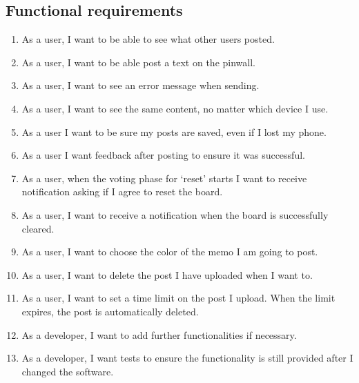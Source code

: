 \documentclass[conference]{IEEEtran}
\numberwithin{figure}{subsection}
\begin{document}
\subsection{Functional requirements}
\begin{enumerate}
 \item As a user, I want to be able to see what other users posted.\\
 \item As a user, I want to be able post a text on the pinwall.\\
 \item As a user, I want to see an error message when sending.\\
 \item As a user, I want to see the same content, no matter which device I use.\\
 \item As a user I want to be sure my posts are saved, even if I lost my phone.\\
 \item As a user I want feedback after posting to ensure it was successful.\\
 \item As a user, when the voting phase for ‘reset’ starts I want to receive notification asking if I agree to reset the board. \\
 \item As a user, I want to receive a notification when the board is successfully cleared.\\
 \item As a user, I want to choose the color of the memo I am going to post.\\
 \item As a user, I want to delete the post I have uploaded when I want to. \\
 \item As a user, I want to set a time limit on the post I upload. When the limit expires, the post is automatically deleted. \\
 \item As a developer, I want to add further functionalities if necessary.\\
 \item As a developer, I want tests to ensure the functionality is still provided after I changed the software.\\
 \end{enumerate}
 
\end{document}
